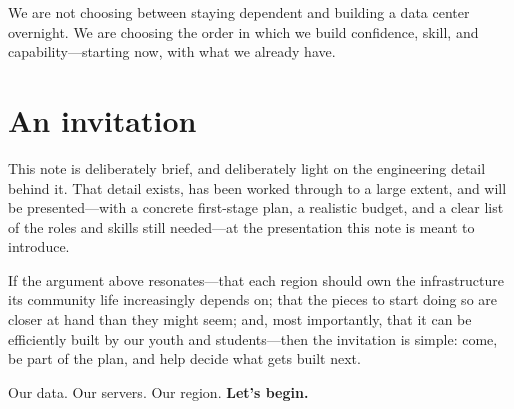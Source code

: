 \documentclass[12pt]{article}
\begin{document}
\begin{vision}
	We are not choosing between staying dependent and building a data center overnight. We are choosing the order in which we build confidence, skill, and capability—starting now, with what we already have.
\end{vision}

\section{An invitation}

This note is deliberately brief, and deliberately light on the engineering detail behind it. That detail exists, has been worked through to a large extent, and will be presented—with a concrete first-stage plan, a realistic budget, and a clear list of the roles and skills still needed—at the presentation this note is meant to introduce.

If the argument above resonates—that each region should own the infrastructure its community life increasingly depends on; that the pieces to start doing so are closer at hand than they might seem; and, most importantly, that it can be efficiently built by our youth and students—then the invitation is simple: come, be part of the plan, and help decide what gets built next.

\vspace{8pt}
\begin{center}
	{\large\color{sovDark} Our data. Our servers. Our region.}\quad
	{\large\color{sovGold}\textbf{Let's begin.}}
\end{center}
\end{document}
